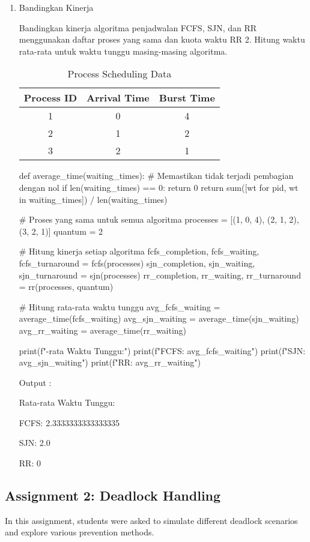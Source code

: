 \documentclass[12pt]{article}
\begin{document}
\begin{enumerate}
    \item Bandingkan Kinerja
        \par  Bandingkan kinerja algoritma penjadwalan FCFS, SJN, dan RR menggunakan daftar proses yang sama dan kuota waktu RR 2. Hitung waktu rata-rata untuk waktu tunggu masing-masing algoritma.
        \begin{table}[h!]
        \centering
        \begin{tabular}{|c|c|c|}
        \hline
        \textbf{Process ID} & \textbf{Arrival Time} & \textbf{Burst Time} \\ \hline
        1 & 0 & 4 \\ \hline
        2 & 1 & 2 \\ \hline
        3 & 2 & 1 \\ \hline
        \end{tabular}
        \caption{Process Scheduling Data}
        \end{table}
        
\begin{python}
def average_time(waiting_times):
    # Memastikan tidak terjadi pembagian dengan nol
    if len(waiting_times) == 0:
        return 0
    return sum([wt for pid, wt in waiting_times]) / len(waiting_times)

# Proses yang sama untuk semua algoritma
processes = [(1, 0, 4), (2, 1, 2), (3, 2, 1)]
quantum = 2

# Hitung kinerja setiap algoritma
fcfs_completion, fcfs_waiting, fcfs_turnaround = fcfs(processes)
sjn_completion, sjn_waiting, sjn_turnaround = sjn(processes)
rr_completion, rr_waiting, rr_turnaround = rr(processes, quantum)

# Hitung rata-rata waktu tunggu
avg_fcfs_waiting = average_time(fcfs_waiting)
avg_sjn_waiting = average_time(sjn_waiting)
avg_rr_waiting = average_time(rr_waiting)

print(f"\nRata-rata Waktu Tunggu:")
print(f"FCFS: {avg_fcfs_waiting}")
print(f"SJN: {avg_sjn_waiting}")
print(f"RR: {avg_rr_waiting}")
\end{python}
        Output : 
        \par Rata-rata Waktu Tunggu:
        \par FCFS: 2.3333333333333335
        \par SJN: 2.0
        \par RR: 0
\end{enumerate}

\subsection{Assignment 2: Deadlock Handling}
In this assignment, students were asked to simulate different deadlock scenarios and explore various prevention methods.
\end{document}
